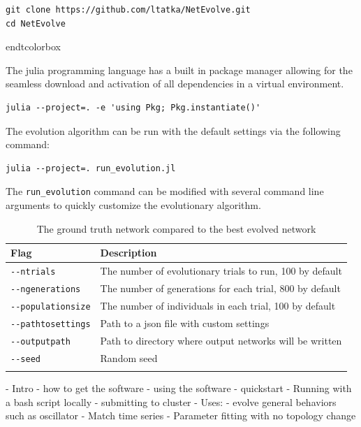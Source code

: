\documentclass[12pt]{report}
\begin{document}
\begin{tcolorbox}
\begin{verbatim}
git clone https://github.com/ltatka/NetEvolve.git
cd NetEvolve
\end{verbatim}
end{tcolorbox}

The julia programming language has a built in package manager allowing for the seamless download and activation of all dependencies in a virtual environment.
\begin{verbatim}
julia --project=. -e 'using Pkg; Pkg.instantiate()'
\end{verbatim}

The evolution algorithm can be run with the default settings via the following command:
\begin{verbatim}
julia --project=. run_evolution.jl
\end{verbatim}

The \verb+run_evolution+ command can be modified with several command line arguments to quickly customize the evolutionary algorithm. 

\begin{table}[]
\begin{tabular}{|l|l|}
\hline
\textbf{Flag}    & \textbf{Description}                                     \\ \hline
\verb+--ntrials+        & The number of evolutionary trials to run, 100 by default \\ \hline
\verb+--ngenerations+   & The number of generations for each trial, 800 by default \\ \hline
\verb+--populationsize+ & The number of individuals in each trial, 100 by default  \\ \hline
\verb+--pathtosettings+ & Path to a json file with custom settings                 \\ \hline
\verb+--outputpath+     & Path to directory where output networks will be written  \\ \hline
\verb+--seed+           & Random seed                                              \\ \hline
\caption[The ground truth network compared to the best evolved network]{The ground truth network compared to the best evolved network}
    \label{fig:evolved_network_structure}
\end{tabular}
\end{table}

- Intro
- how to get the software
- using the software
	- quickstart
	- Running with a bash script locally
	- submitting to cluster
- Uses:
	- evolve general behaviors such as oscillator
	- Match time series
	- Parameter fitting with no topology change
	

\end{tcolorbox}
\end{document}
